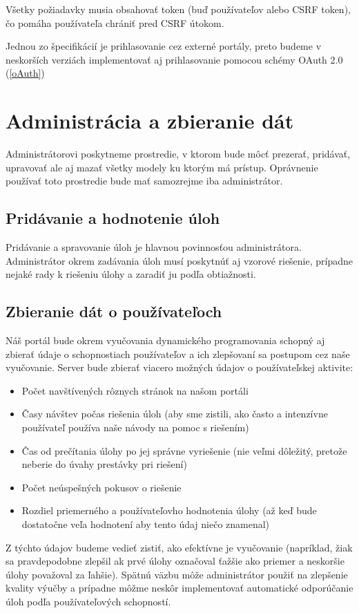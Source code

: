 Všetky požiadavky musia obsahovať token (buď používateľov alebo CSRF token),
čo pomáha používateľa chrániť pred CSRF útokom.

Jednou zo špecifikácií je prihlasovanie cez externé portály, preto budeme v neskorších verziách implementovať
aj prihlasovanie pomocou schémy OAuth 2.0 (\ref{oAuth})
\section{Administrácia a zbieranie dát}
Administrátorovi poskytneme prostredie, v ktorom bude môcť prezerať, pridávať,
upravovať ale aj mazať všetky modely ku ktorým má prístup. Oprávnenie
používať toto prostredie bude mať samozrejme iba administrátor.
\subsection{Pridávanie a hodnotenie úloh}
Pridávanie a spravovanie úloh je hlavnou povinnosťou administrátora. Administrátor
okrem zadávania úloh musí poskytnúť aj vzorové riešenie, prípadne nejaké rady k
riešeniu úlohy a zaradiť ju podľa obtiažnosti.

\subsection{Zbieranie dát o používateľoch}
\label{zbieraniedata}
Náš portál bude okrem vyučovania dynamického programovania schopný aj zbierať údaje o
schopnostiach používateľov a ich zlepšovaní sa postupom cez naše vyučovanie.
Server bude zbierať viacero možných údajov o používateľskej aktivite:
\begin{itemize}
\item Počet navštívených rôznych stránok na našom portáli
\item Časy návštev počas riešenia úloh (aby sme zistili, ako často a intenzívne používateľ používa naše návody na pomoc s riešením)
\item Čas od prečítania úlohy po jej správne vyriešenie (nie veľmi dôležitý, pretože neberie do úvahy prestávky pri riešení)
\item Počet neúspešných pokusov o riešenie
\item Rozdiel priemerného a používateľovho hodnotenia úlohy (až keď bude dostatočne veľa hodnotení aby tento údaj niečo znamenal)
\end{itemize}

Z týchto údajov budeme vedieť zistiť, ako efektívne je vyučovanie
(napríklad, žiak sa pravdepodobne zlepšil ak prvé úlohy označoval ťažšie ako priemer a neskoršie úlohy považoval za ľahšie).
Spätnú väzbu môže administrátor použiť na zlepšenie kvality výučby
a prípadne môžme neskôr implementovať automatické odporúčanie úloh podľa používateľových schopností.

